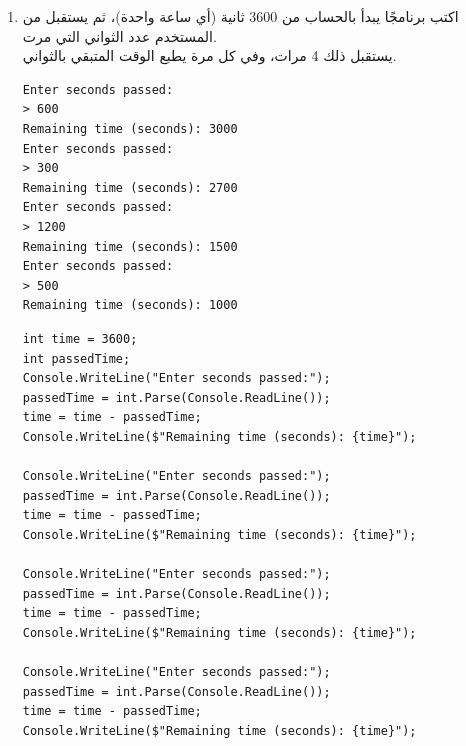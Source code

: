 \documentclass[14pt]{extarticle}
\begin{document}
\begin{enumerate}[itemsep=2cm]
{\fi
}

\item
اكتب برنامجًا يبدأ بالحساب من 3600 ثانية (أي ساعة واحدة)، ثم يستقبل من المستخدم عدد الثواني التي مرت. \\
يستقبل ذلك 4 مرات، وفي كل مرة يطبع الوقت المتبقي بالثواني.
{\small
\ifdetailed
\begin{boxExample}
\begin{english}
\begin{verbatim}
Enter seconds passed:
> 600
Remaining time (seconds): 3000
Enter seconds passed:
> 300
Remaining time (seconds): 2700
Enter seconds passed:
> 1200
Remaining time (seconds): 1500
Enter seconds passed:
> 500
Remaining time (seconds): 1000
\end{verbatim}
\end{english}
\end{boxExample}

\ifwithsols
\begin{boxSolution}
\begin{english}
\begin{verbatim}
int time = 3600;
int passedTime;
Console.WriteLine("Enter seconds passed:");
passedTime = int.Parse(Console.ReadLine());
time = time - passedTime;
Console.WriteLine($"Remaining time (seconds): {time}");

Console.WriteLine("Enter seconds passed:");
passedTime = int.Parse(Console.ReadLine());
time = time - passedTime;
Console.WriteLine($"Remaining time (seconds): {time}");

Console.WriteLine("Enter seconds passed:");
passedTime = int.Parse(Console.ReadLine());
time = time - passedTime;
Console.WriteLine($"Remaining time (seconds): {time}");

Console.WriteLine("Enter seconds passed:");
passedTime = int.Parse(Console.ReadLine());
time = time - passedTime;
Console.WriteLine($"Remaining time (seconds): {time}");
\end{verbatim}
\end{english}
\end{boxSolution}
\fi
\fi
}

\clearpage


\end{enumerate}
\end{document}
